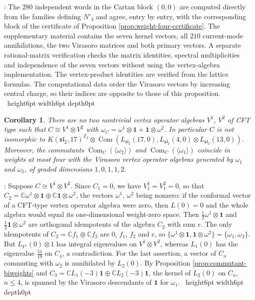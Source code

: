 \documentclass[leqno]{article}
\newcommand{\Cbb}{\ensuremath{\mathbb{C}}}
\newcommand{\Z}{\ensuremath{\mathbb{Z}}}
\newcommand{\la}{\langle}
\newcommand{\ra}{\rangle}
\renewcommand{\leq}{\ensuremath{\leqslant}}
\newcommand{\qed}{\hfill \vrule height6pt  width6pt depth0pt}
\newcommand{\ot}{\otimes}
\newtheorem{cor}[thm]{Corollary}
\newenvironment{proof}[1][]{\noindent {\it Proof #1} : }{\hbox{~}\qed
\smallskip
}
\numberwithin{equation}{section}
\begin{document}
\begin{proof}
The $280$ independent words in the Cartan block $(0,0)$ are computed directly from the families defining $N'_4$ and agree, entry by entry, with the corresponding block of the certificate of Proposition \ref{prop:weight-four-certificate}. The supplementary material contains the seven kernel vectors, all $210$ current-mode annihilations, the two Virasoro matrices and both primary vectors. A separate rational-matrix verification checks the matrix identities, spectral multiplicities and independence of the seven vectors without using the vertex-algebra implementation. The vertex-product identities are verified from the lattice formulas. The computational data order the Virasoro vectors by increasing central charge, so their indices are opposite to those of this proposition.
\end{proof}

\begin{cor}
\label{cor:commutant-not-tensor}
There are no two nontrivial vertex operator algebras $V^1$, $V^2$ of CFT type such that $C \cong V^1 \ot V^2$ with $\omega_C = \omega^1 \ot \mathbf 1+\mathbf 1 \ot \omega^2$. In particular $C$ is not isomorphic to $K(\mathfrak{sl}_2,17)^{\Z_2} \ot \operatorname{Com}(L_{\mathfrak{sl}_2}(17,0), L_{\mathfrak{sl}_2}(4,0) \ot L_{\mathfrak{sl}_2}(13,0))$. Moreover, the commutants $\operatorname{Com}_C(\la\omega_2\ra)$ and $\operatorname{Com}_C(\la\omega_1\ra)$ coincide in weights at most four with the Virasoro vertex operator algebras generated by $\omega_1$ and $\omega_2$, of graded dimensions $1, 0, 1, 1, 2$.
\end{cor}

\begin{proof}
Suppose $C \cong V^1 \ot V^2$. Since $C_1 = 0$, we have $V^1_1 = V^2_1 = 0$, so that $C_2 = \Cbb \omega^1 \ot \mathbf 1 \oplus \Cbb \mathbf 1 \ot \omega^2$, the vectors $\omega^1$, $\omega^2$ being nonzero: if the conformal vector of a CFT-type vertex operator algebra were zero, then $L(0) = 0$ and the whole algebra would equal its one-dimensional weight-zero space. Then $\frac12\omega^1 \ot \mathbf 1$ and $\frac12\mathbf 1 \ot \omega^2$ are orthogonal idempotents of the algebra $C_2$ with sum $e$. The only idempotents of $C_2 = \Cbb f_1 \oplus \Cbb f_2$ are $0$, $f_1$, $f_2$ and $e$, so $\{\omega^1 \ot \mathbf 1, \mathbf 1 \ot \omega^2\} = \{\omega_1,\omega_2\}$. But $L_{V^1}(0) \ot 1$ has integral eigenvalues on $V^1 \ot V^2$, whereas $L_1(0)$ has the eigenvalue $\frac{51}{19}$ on $C_4$, a contradiction. For the last assertion, a vector of $C_n$ commuting with $\omega_2$ is annihilated by $L_2(0)$. By Proposition \ref{prop:commutant-biweights} and $C_3 = \Cbb L_1(-3)\mathbf 1 \oplus \Cbb L_2(-3)\mathbf 1$, the kernel of $L_2(0)$ on $C_n$, $n \leq 4$, is spanned by the Virasoro descendants of $\mathbf 1$ for $\omega_1$.
\end{proof}
\end{document}
